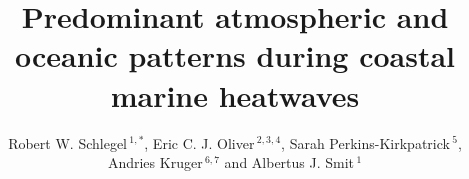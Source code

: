 \documentclass[utf8]{frontiersSCNS}
\def\firstAuthorLast{Sample {et~al.}} %
\def\Authors{Robert W. Schlegel\,$^{1,*}$, Eric C. J. Oliver\,$^{2,3,4}$, Sarah Perkins-Kirkpatrick\,$^{5}$, Andries Kruger\,$^{6,7}$ and Albertus J. Smit\,$^{1}$}
\begin{document}
\onecolumn
{}

\title[Air-sea patterns during marine heatwaves]{Predominant atmospheric and oceanic patterns during coastal marine heatwaves} 

\author[\firstAuthorLast ]{\Authors} %
\address{} %
\correspondance{} %

\extraAuth{}%


\maketitle
\end{document}
